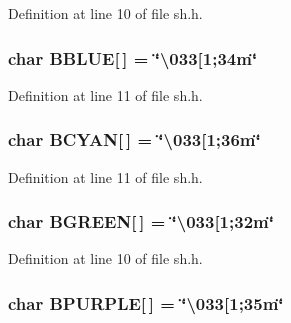 Definition at line 10 of file sh.\+h.

\subsubsection[{\texorpdfstring{B\+B\+L\+UE}{BBLUE}}]{\setlength{\rightskip}{0pt plus 5cm}char B\+B\+L\+UE\mbox{[}$\,$\mbox{]} = \char`\"{}\textbackslash{}033\mbox{[}1;34m\char`\"{}}\hypertarget{namespace_k_a2fcd49453f10ffd3ccb5aebe30f5d0c0}{}\label{namespace_k_a2fcd49453f10ffd3ccb5aebe30f5d0c0}


Definition at line 11 of file sh.\+h.

\subsubsection[{\texorpdfstring{B\+C\+Y\+AN}{BCYAN}}]{\setlength{\rightskip}{0pt plus 5cm}char B\+C\+Y\+AN\mbox{[}$\,$\mbox{]} = \char`\"{}\textbackslash{}033\mbox{[}1;36m\char`\"{}}\hypertarget{namespace_k_a2c3e50cb34db635087047ef75ab1ca52}{}\label{namespace_k_a2c3e50cb34db635087047ef75ab1ca52}


Definition at line 11 of file sh.\+h.

\subsubsection[{\texorpdfstring{B\+G\+R\+E\+EN}{BGREEN}}]{\setlength{\rightskip}{0pt plus 5cm}char B\+G\+R\+E\+EN\mbox{[}$\,$\mbox{]} = \char`\"{}\textbackslash{}033\mbox{[}1;32m\char`\"{}}\hypertarget{namespace_k_aa83d8d71c463813bdbd57fab20312b7d}{}\label{namespace_k_aa83d8d71c463813bdbd57fab20312b7d}


Definition at line 10 of file sh.\+h.

\subsubsection[{\texorpdfstring{B\+P\+U\+R\+P\+LE}{BPURPLE}}]{\setlength{\rightskip}{0pt plus 5cm}char B\+P\+U\+R\+P\+LE\mbox{[}$\,$\mbox{]} = \char`\"{}\textbackslash{}033\mbox{[}1;35m\char`\"{}}\hypertarget{namespace_k_adcaba86455bd5bd0cbdeac28c4fced2b}{}\label{namespace_k_adcaba86455bd5bd0cbdeac28c4fced2b}



